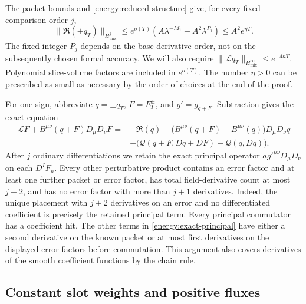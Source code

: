 The packet bounds and \eqref{energy:reduced-structure} give, for every
fixed comparison order \(j\),
\begin{equation}\label{energy:packet-residual}
 \lVert\mathfrak R(\pm q_T)\rVert_{H^j_{\mathrm{mix}}}
 \le e^{o(T)}(A\lambda^{-M_1}+A^2\lambda^{P_j})
 \le A^2e^{\eta T}.
\end{equation}
The fixed integer \(P_j\) depends on the base derivative order, not
on the subsequently chosen formal accuracy. We will also require
\(\lVert\mathcal Lq_T\rVert_{H^{60}_{\mathrm{mix}}}
\le e^{-4\kappa T}\). Polynomial slice-volume factors are included
in \(e^{o(T)}\). The number \(\eta>0\) can be prescribed as small
as necessary by the order of choices at the end of the proof.

For one sign, abbreviate \(q=\pm q_T\), \(F=F_T^\pm\), and
\(g'=g_{q+F}\). Subtraction gives the exact equation
\begin{equation}\label{energy:exact-principal}
 \begin{split}
 \mathcal LF+B^{\mu\nu}(q+F)D_\mu D_\nu F
 ={}&-\mathfrak R(q)
  -\bigl(B^{\mu\nu}(q+F)-B^{\mu\nu}(q)\bigr)D_\mu D_\nu q\\
 &-\bigl(\mathcal Q(q+F,Dq+DF)-\mathcal Q(q,Dq)\bigr).
 \end{split}
\end{equation}
After \(j\) ordinary differentiations we retain the exact principal
operator \(a g'^{\mu\nu}D_\mu D_\nu\) on each \(D^IF_n\).
Every other perturbative product contains an error factor and at least
one further packet or error factor, has total field-derivative count
at most \(j+2\), and has no error factor with more than \(j+1\)
derivatives. Indeed, the unique placement with \(j+2\) derivatives
on an error and no differentiated coefficient is precisely the
retained principal term. Every principal commutator has a coefficient
hit. The other terms in \eqref{energy:exact-principal} have either a
second derivative on the known packet or at most first derivatives on
the displayed error factors before commutation. This argument also
covers derivatives of the smooth coefficient functions by the chain
rule.

\subsection{Constant slot weights and positive fluxes}

